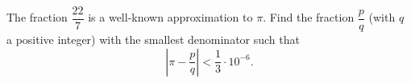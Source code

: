 The fraction \(\dfrac{22}{7}\) is a well-known approximation to \(\pi\). Find the fraction \(\dfrac {p}{q}\) (with \(q\) a positive integer) with the smallest denominator such that
\[
\left|\pi-\dfrac {p}{q}\right|<\dfrac{1}{3}\cdot10^{-6}.
\]
